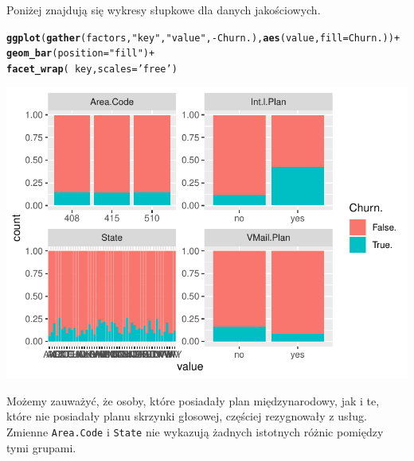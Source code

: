 \documentclass{article}\usepackage[]{graphicx}\usepackage[]{color}
\makeatletter
\def\maxwidth{ %
  \ifdim\Gin@nat@width>\linewidth
    \linewidth
  \else
    \Gin@nat@width
  \fi
}
\newcommand{\hlstr}[1]{\textcolor[rgb]{0.192,0.494,0.8}{#1}}%
\newcommand{\hlopt}[1]{\textcolor[rgb]{0,0,0}{#1}}%
\newcommand{\hlstd}[1]{\textcolor[rgb]{0.345,0.345,0.345}{#1}}%
\newcommand{\hlkwc}[1]{\textcolor[rgb]{0.333,0.667,0.333}{#1}}%
\newcommand{\hlkwd}[1]{\textcolor[rgb]{0.737,0.353,0.396}{\textbf{#1}}}%
\newenvironment{kframe}{%
 \def\at@end@of@kframe{}%
 \ifinner\ifhmode%
  \def\at@end@of@kframe{\end{minipage}}%
  \begin{minipage}{\columnwidth}%
 \fi\fi%
 \def\FrameCommand##1{\hskip\@totalleftmargin \hskip-\fboxsep
 \colorbox{shadecolor}{##1}\hskip-\fboxsep
     \hskip-\linewidth \hskip-\@totalleftmargin \hskip\columnwidth}%
 \MakeFramed {\advance\hsize-\width
   \@totalleftmargin\z@ \linewidth\hsize
   \@setminipage}}%
 {\par\unskip\endMakeFramed%
 \at@end@of@kframe}
\newenvironment{knitrout}{}{} %
\makeatother
\begin{document}
Poniżej znajdują się wykresy słupkowe dla danych jakościowych.
\begin{knitrout}
\color{fgcolor}\begin{kframe}
\begin{alltt}
\hlkwd{ggplot}\hlstd{(}\hlkwd{gather}\hlstd{(factors,} \hlstr{"key"}\hlstd{,} \hlstr{"value"}\hlstd{,} \hlopt{-}\hlstd{Churn.),} \hlkwd{aes}\hlstd{(value,} \hlkwc{fill}\hlstd{=Churn.))} \hlopt{+}
  \hlkwd{geom_bar}\hlstd{(}\hlkwc{position}\hlstd{=}\hlstr{"fill"}\hlstd{)} \hlopt{+}
  \hlkwd{facet_wrap}\hlstd{(}\hlopt{~}\hlstd{key,} \hlkwc{scales}\hlstd{=}\hlstr{'free'}\hlstd{)}
\end{alltt}
\end{kframe}

{\centering \includegraphics[width=\maxwidth]{figure/Wykresy_slupkowe_dla_wszystkich_zmiennych-1} 

}



\end{knitrout}

Możemy zauważyć, że osoby, które posiadały plan międzynarodowy, jak i te, które nie posiadały planu skrzynki głosowej, częściej rezygnowały z usług. Zmienne \verb|Area.Code| i \verb|State| nie wykazują żadnych istotnych różnic pomiędzy tymi grupami.
\end{document}
